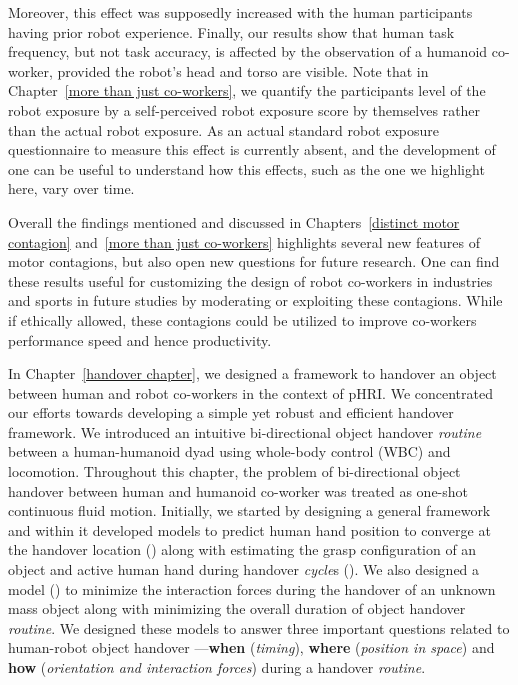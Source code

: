 Moreover, this effect was supposedly increased with the human participants having prior robot experience. Finally, our results show that human task frequency, but not task accuracy, is affected by the observation of a humanoid co-worker, provided the robot's head and torso are visible. Note that in Chapter~\ref{more than just co-workers}, we quantify the participants level of the robot exposure by a self-perceived robot exposure score by themselves rather than the actual robot exposure. As an actual standard robot exposure questionnaire to measure this effect is currently absent, and the development of one can be useful to understand how this effects, such as the one we highlight here, vary over time.

Overall the findings mentioned and discussed in Chapters~\ref{distinct motor contagion} and~\ref{more than just co-workers} highlights several new features of motor contagions, but also open new questions for future research. One can find these results useful for customizing the design of robot co-workers in industries and sports in future studies by moderating or exploiting these contagions. While if ethically allowed, these contagions could be utilized to improve co-workers performance speed and hence productivity.




In Chapter~\ref{handover chapter}, we designed a framework to handover an object between human and robot co-workers in the context of pHRI. We concentrated our efforts towards developing a simple yet robust and efficient handover framework. We introduced an intuitive bi-directional object handover \textit{routine} between a human-humanoid dyad using whole-body control (WBC) and locomotion. Throughout this chapter, the problem of bi-directional object handover between human and humanoid co-worker was treated as one-shot continuous fluid motion. Initially, we started by designing a general framework and within it developed models to predict human hand position to converge at the handover location () along with estimating the grasp configuration of an object and active human hand during handover \textit{cycle}s (). We also designed a model () to minimize the interaction forces during the handover of an unknown mass object along with minimizing the overall duration of object handover \textit{routine}. We designed these models to answer three important questions related to human-robot object handover ---\textbf{when} (\textit{timing}), \textbf{where} (\textit{position in space}) and \textbf{how} (\textit{orientation and interaction forces}) during a handover \textit{routine}. 

